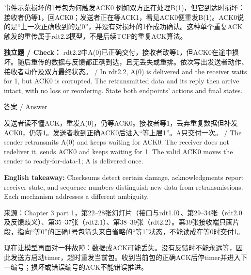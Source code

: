 

\begin{StudyBlock}{事件示范}{损坏的1号包为何触发ACK0}
例如双方正在处理B(1)，但它到达时损坏：接收者仍等1，回ACK0；发送者正在等ACK1，看见ACK0便重发B(1)。ACK0说的是“上一次正确收到的是0”，并没有对损坏的1作成功确认。这种单个重复ACK触发的重传属于rdt2.2模型，不是后续TCP的重复ACK算法。
\end{StudyBlock}


\textbf{独立题 / Check：} rdt2.2中A(0)已正确交付，接收者改等1，但ACK0在途中损坏。随后重传的数据与反馈都正确到达，且无丢失或重排。依次写出发送者动作、接收者动作及双方最终状态。 / In rdt2.2, A(0) is delivered and the receiver waits for 1, but ACK0 is corrupted. The retransmitted data and its reply then arrive intact, with no loss or reordering. State both endpoints' actions and final states.



\begin{StudySolution}{答案 / Answer}


发送者读不懂ACK，重发A(0)，仍等ACK0。接收者等1，丢弃重复数据但补发ACK0，仍等1。发送者收到正确ACK0后进入“等上层1”。A只交付一次。 / The sender retransmits A(0) and keeps waiting for ACK0. The receiver does not redeliver it, sends ACK0 and keeps waiting for 1. The valid ACK0 moves the sender to ready-for-data-1; A is delivered once.


\end{StudySolution}


\textbf{English takeaway:} Checksums detect certain damage, acknowledgments report receiver state, and sequence numbers distinguish new data from retransmissions. Each mechanism addresses a different ambiguity.


来源：Chapter 3 part 1，第22–28张幻灯片（接口与rdt1.0）、第29–34张（rdt2.0及反馈歧义）、第35–37张（rdt2.1）、第38–39张（rdt2.2）。第39张接收端只画片段，指向“等0”的正确1号包箭头来自省略的“等1”状态，不能读成在等0时交付1。








现在让模型再面对一种故障：数据或ACK可能丢失。没有反馈时不能永远等，因此发送方启动timer，超时重发当前包。收到当前包的正确ACK后停timer并进入下一编号；损坏或错误编号的ACK不能错误推进。


